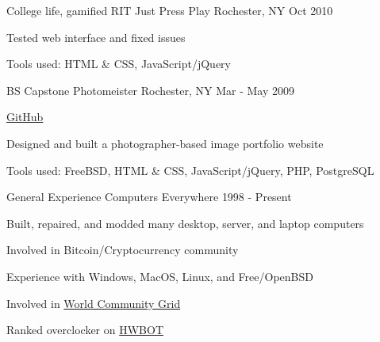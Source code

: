 \begin{cventries}
  \cventry
    {College life, gamified} %
    {RIT Just Press Play} %
    {Rochester, NY} %
    {Oct 2010} %
    {
      \begin{cvitems} %
        \item {Tested web interface and fixed issues}
        \item {Tools used: HTML \& CSS, JavaScript/jQuery}
      \end{cvitems}
    }


  \cventry
    {BS Capstone} %
    {Photomeister} %
    {Rochester, NY} %
    {Mar - May 2009} %
    {
      \begin{cvitems} %
        \item {\href{https://github.com/desnudopenguino/photomeister}{GitHub}}
        \item {Designed and built a photographer-based image portfolio website}
        \item {Tools used: FreeBSD, HTML \& CSS, JavaScript/jQuery, PHP, PostgreSQL}
      \end{cvitems}
    }


  \cventry
    {General Experience} %
    {Computers} %
    {Everywhere} %
    {1998 - Present} %
    {
      \begin{cvitems} %
        \item {Built, repaired, and modded many desktop, server, and laptop computers}
        \item {Involved in Bitcoin/Cryptocurrency community}
        \item {Experience with Windows, MacOS, Linux, and Free/OpenBSD}
        \item {Involved in \href{https://www.worldcommunitygrid.org/stats/viewMemberInfo.do?userName=desnudopenguino}{World Community Grid}}
        \item {Ranked overclocker on \href{https://hwbot.org/user/desnudopenguino/}{HWBOT}}
      \end{cvitems}
   }

\end{cventries}
